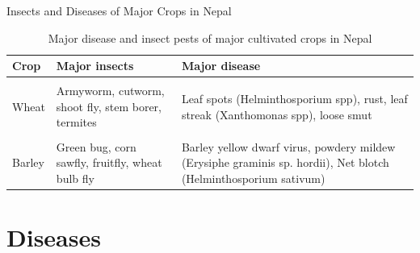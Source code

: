 \documentclass[10pt,dvipsnames,ignorenonframetext,aspectratio=169]{beamer}
\begin{document}
\begin{frame}{Insects and Diseases of Major Crops in Nepal}
\protect\hypertarget{insects-and-diseases-of-major-crops-in-nepal}{}
\begin{table}[H]

\caption{\label{tab:insect-pests-major}Major disease and insect pests of major cultivated crops in Nepal}
\centering
\fontsize{6}{8}\selectfont
\begin{tabular}[t]{l>{\raggedright\arraybackslash}p{20em}>{\raggedright\arraybackslash}p{20em}}
\toprule
Crop & Major insects & Major disease\\
\midrule
\cellcolor{gray!6}{Rice} & \cellcolor{gray!6}{Rice bug, rice hispa, yellow stem borer, stripped stem borer, rice gall midge, mole cricket, plant hopper} & \cellcolor{gray!6}{Bacterial blight (Xanthomonas oryzae), Blast (Pyricularia oryzae), False smut (Ustilaginoides virens), Brown leaf spot (Helminthosporium oryzae)}\\
Wheat & Armyworm, cutworm, shoot fly, stem borer, termites & Leaf spots (Helminthosporium spp), rust, leaf streak (Xanthomonas spp), loose smut\\
\cellcolor{gray!6}{Maize} & \cellcolor{gray!6}{Stalk borer, shoot fly, cutworm, jassid, armyworm} & \cellcolor{gray!6}{Rust, leaf blight (Helminthosporium maydis), smut (Specealothica reliana)}\\
Barley & Green bug, corn sawfly, fruitfly, wheat bulb fly & Barley yellow dwarf virus, powdery mildew (Erysiphe graminis sp. hordii), Net blotch (Helminthosporium sativum)\\
\bottomrule
\end{tabular}
\end{table}
\end{frame}

\hypertarget{diseases}{%
\section{Diseases}\label{diseases}}
\end{document}
